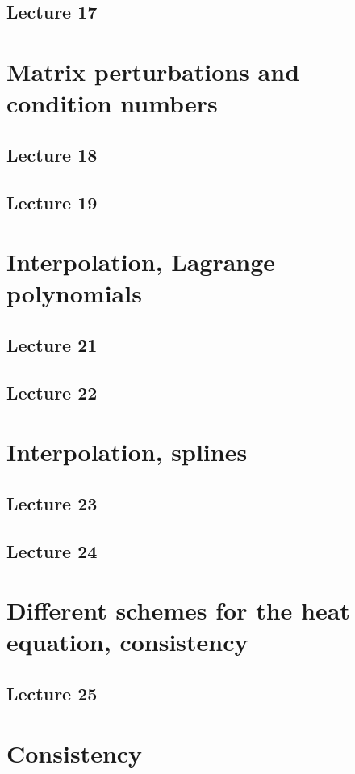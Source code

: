 \documentclass{article}
\begin{document}
\subsection{Lecture 17}


\section{Matrix perturbations and condition numbers}
\subsection{Lecture 18}
\subsection{Lecture 19}


\section{Interpolation, Lagrange polynomials}
\subsection{Lecture 21}
\subsection{Lecture 22}


\section{Interpolation, splines}
\subsection{Lecture 23}
\subsection{Lecture 24}


\section{Different schemes for the heat equation, consistency}
\subsection{Lecture 25}


\section{Consistency}
\end{document}
